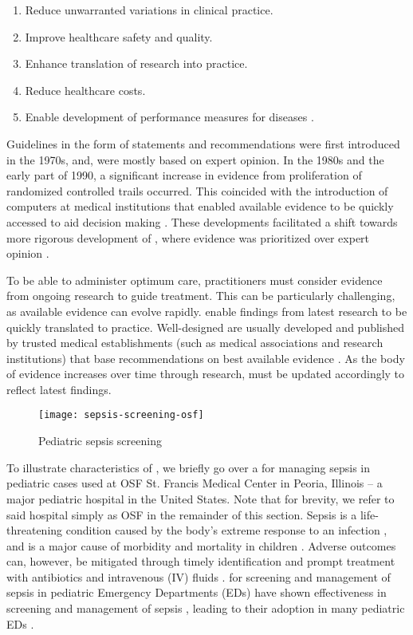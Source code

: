 \begin{enumerate}
  \item Reduce unwarranted variations in clinical practice.
  \item Improve healthcare safety and quality.
  \item Enhance translation of research into practice.
  \item Reduce healthcare costs.
  \item Enable development of performance measures for diseases
    \cite{GuerraInjury23, BusseWHO19}.
\end{enumerate}

Guidelines in the form of statements and recommendations
were first introduced in the 1970s,
and, were mostly based on expert opinion.
In the 1980s and the early part of 1990,
a significant increase in evidence from proliferation of randomized controlled
trails occurred. This coincided with the introduction
of computers at medical institutions that enabled available evidence
to be quickly accessed to aid decision making \cite{GuyattAMA92,SackettJPH95}.
These developments facilitated a shift towards more rigorous
development of \BPGs{}, where evidence was prioritized over expert opinion
\cite{GuerraInjury23}.

To be able to administer optimum care, practitioners must consider
evidence from ongoing research to guide treatment. This
can be particularly challenging, as available evidence can evolve rapidly.
\BPGs{} enable findings from latest research to be quickly translated to
practice. Well-designed \BPGs{} are usually developed and published by trusted medical
establishments (such as medical associations and research institutions)
that base recommendations on best available evidence \cite{GuerraInjury23}.
As the body of evidence increases over time through research,
\BPGs{} must be updated accordingly to reflect latest findings.

\begin{figure}[b!]
  \centering
  \texttt{[image: sepsis-screening-osf]}
  \caption{Pediatric sepsis screening \BPG{}}\label{fig:sepsis-screening}
\end{figure}

To illustrate characteristics of \BPGs{}, we briefly go over a \BPG{}
for managing sepsis in pediatric cases used at OSF St. Francis Medical Center
in Peoria, Illinois -- a major pediatric hospital in the United States. Note
that for brevity, we refer to said hospital simply as OSF in the remainder of
this section.
Sepsis is a life-threatening condition caused by the body's extreme response to
an infection \cite{RhodesICM17}, and is
a major cause of morbidity and mortality in children \cite{Eisenberg2021JP}.
Adverse outcomes can, however, be mitigated through timely
identification and prompt treatment with antibiotics and
intravenous (IV) fluids \cite{Weiss2014CCM,Evans2018JAMA}.
\BPGs{} for screening and management of sepsis in pediatric Emergency
Departments (EDs) have shown effectiveness in screening and management of sepsis \cite{Eisenberg2021JP},
leading to their adoption in many pediatric EDs \cite{Balamuth2017EM,Sepanski2014FP}.

